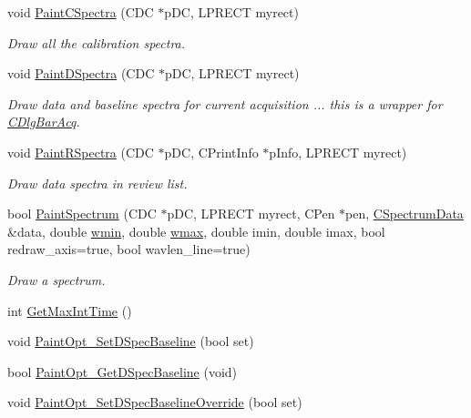 \begin{DoxyCompactItemize}
void \hyperlink{classCSpectrometer_af6001c8c46a0e71159a7e7ecfdc02934}{PaintCSpectra} (CDC $\ast$pDC, LPRECT myrect)
\begin{DoxyCompactList}\small\item\em Draw all the calibration spectra. \item\end{DoxyCompactList}\item 
void \hyperlink{classCSpectrometer_af35d86b3aaf2b3f85124fdad35fc4931}{PaintDSpectra} (CDC $\ast$pDC, LPRECT myrect)
\begin{DoxyCompactList}\small\item\em Draw data and baseline spectra for current acquisition ... this is a wrapper for \hyperlink{classCDlgBarAcq}{CDlgBarAcq}. \item\end{DoxyCompactList}\item 
void \hyperlink{classCSpectrometer_a4899d03fcf472b062757cc0d6febab10}{PaintRSpectra} (CDC $\ast$pDC, CPrintInfo $\ast$pInfo, LPRECT myrect)
\begin{DoxyCompactList}\small\item\em Draw data spectra in review list. \item\end{DoxyCompactList}\item 
bool \hyperlink{classCSpectrometer_a967b4745f665e20e708faeec9a4498f6}{PaintSpectrum} (CDC $\ast$pDC, LPRECT myrect, CPen $\ast$pen, \hyperlink{classCSpectrumData}{CSpectrumData} \&data, double \hyperlink{classCSpectrometer_a82f43ea9e9294a0e5f4f5609464db845}{wmin}, double \hyperlink{classCSpectrometer_a2baa66aaecaf486e610e352a89799609}{wmax}, double imin, double imax, bool redraw\_\-axis=true, bool wavlen\_\-line=true)
\begin{DoxyCompactList}\small\item\em Draw a spectrum. \item\end{DoxyCompactList}\item 
int \hyperlink{classCSpectrometer_aeeac50ddbf78f88cd8a30d46c61511bb}{GetMaxIntTime} ()
\item 
void \hyperlink{classCSpectrometer_afbddb477263a2903b1bce92931187abe}{PaintOpt\_\-SetDSpecBaseline} (bool set)
\item 
bool \hyperlink{classCSpectrometer_a0d8aa37eb5c26468fe73c5a99f234828}{PaintOpt\_\-GetDSpecBaseline} (void)
\item 
void \hyperlink{classCSpectrometer_a352c2639c40c17b841ebaa50d8f1d537}{PaintOpt\_\-SetDSpecBaselineOverride} (bool set)

\end{DoxyCompactItemize}
